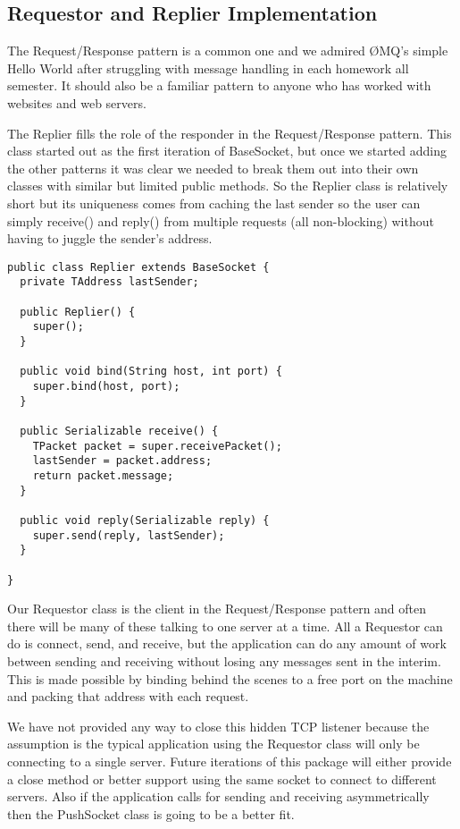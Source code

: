\documentclass[10pt,journal,compsoc]{IEEEtran}
\begin{document}
\subsection{Requestor and Replier Implementation}

The Request/Response pattern is a common one and we admired ØMQ's simple Hello World after struggling with message handling in each homework all semester. It should also be a familiar pattern to anyone who has worked with websites and web servers.

The Replier fills the role of the responder in the Request/Response pattern. This class started out as the first iteration of BaseSocket, but once we started adding the other patterns it was clear we needed to break them out into their own classes with similar but limited public methods. So the Replier class is relatively short but its uniqueness comes from caching the last sender so the user can simply receive() and reply() from multiple requests (all non-blocking) without having to juggle the sender's address.

\begin{lstlisting}
public class Replier extends BaseSocket {
  private TAddress lastSender;

  public Replier() {
    super();
  }

  public void bind(String host, int port) {
    super.bind(host, port);
  }

  public Serializable receive() {
    TPacket packet = super.receivePacket();
    lastSender = packet.address;
    return packet.message;
  }

  public void reply(Serializable reply) {
    super.send(reply, lastSender);
  }

}

\end{lstlisting}

Our Requestor class is the client in the Request/Response pattern and often there will be many of these talking to one server at a time. All a Requestor can do is connect, send, and receive, but the application can do any amount of work between sending and receiving without losing any messages sent in the interim. This is made possible by binding behind the scenes to a free port on the machine and packing that address with each request.

We have not provided any way to close this hidden TCP listener because the assumption is the typical application using the Requestor class will only be connecting to a single server. Future iterations of this package will either provide a close method or better support using the same socket to connect to different servers. Also if the application calls for sending and receiving asymmetrically then the PushSocket class is going to be a better fit.
\end{document}
